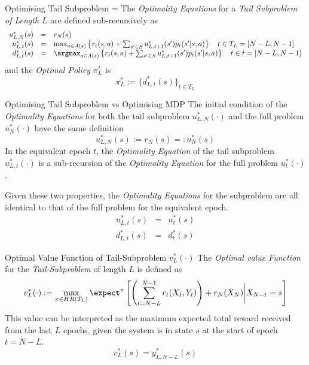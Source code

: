 \documentclass[11pt,a4paper]{article}
\begin{document}
  \begin{proposition}{Optimising Tail Subproblem}
    \everymath={\displaystyle}
    The \textit{Optimality Equations} for a \textit{Tail Subproblem of Length $L$} are defined sub-recursively as
    \[\begin{array}{rcl}
      u^*_{L,N}(s)&=&r_N(s)\\
      u_{L,t}^*(s)&=&\max_{a\in A(s)}\left\{r_t(s,a)+\sum_{s'\in S}u_{L,t+1}^*(s')p_t(s'|s,a)\right\}\quad t\in T_L=[N-L,N-1]\\
      d_{L,t}^*(s)&=&\argmax_{a\in A(s)}\left\{r_t(s,a)+\sum_{s'\in S}u_{L,t+1}^*(s')p_t(s'|s,a)\right\}\quad t\in t=[N-L,N-1]\\
    \end{array}\]
    and the \textit{Optimal Policy} $\pi_L^*$ is
    \[ \pi^*_L:=\{d_{L,t}^*(s)\}_{t\in T_L} \]
  \end{proposition}

  \begin{remark}{Optimising Tail Subproblem vs Optimising MDP}
    The initial condition of the \textit{Optimality Equations} for both the tail subproblem $u_{L,N}^*(\cdot)$ and the full problem $u_N^*(\cdot)$ have the same definition
    \[ u_{L,N}^*(s):=r_N(s)=:u_N^*(s) \]
    In the equivalent epoch $t$, the \textit{Optimality Equation} of the tail subproblem $u_{L,t}^*(\cdot)$ is a sub-recursion of the \textit{Optimality Equation} for the full problem $u_t^*(\cdot)$.
    \par Given these two properties, the \textit{Optimality Equations} for the subproblem are all identical to that of the full problem for the equivalent epoch.
    \[\begin{array}{rcl}
      u_{L,t}^*(s)&=&u_t^*(s)\\
      d_{L,t}^*(s)&=&d_t^*(s)
    \end{array}\]
  \end{remark}

  \begin{definition}{Optimal Value Function of Tail-Subproblem $v_L^*(\cdot)$}
    The \textit{Optimal value Function} for the \textit{Tail-Subproblem} of length $L$ is defined as
    \[ v_L^*(\cdot):=\max_{\pi\in HR(T_L)}\expect^\pi\left[\left(\sum_{t=N-L}^{N-1}r_t(X_t,Y_t)\right)+r_N(X_N)\bigg|X_{N-t}=s\right] \]
    This value can be interpreted as the maximum expected total reward received from the last $L$ epochs, given the system is in state $s$ at the start of epoch $t=N-L$.
    \[ v_L^*(s)=y_{L,N-L}^*(s) \]
  \end{definition}
\end{document}
